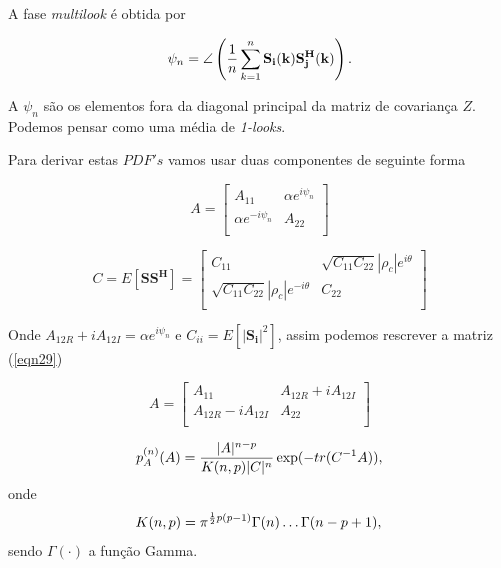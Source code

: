 \documentclass[12pt,a4paper]{article}
\begin{document}
A fase {\it multilook} é obtida por 

\begin{equation}\label{eqn28}
	\psi_n=\angle\left(\frac{1}{n}\sum_{k=1}^{n}\mathbf{S_i(k)S_j^{H}(k)}\right). \\
\end{equation}

A $\psi_n$ são os elementos fora da diagonal principal da matriz de covariança $Z$. Podemos pensar como uma média de {\it 1-looks}.

Para derivar estas $PDF's$ vamos usar duas componentes de seguinte forma

\begin{equation}\label{eqn29}
	A=\left[
\begin{array}{cc}
	A_{11}              & \alpha e^{i\psi_n} \\
	\alpha e^{-i\psi_n} & A_{22} \\
\end{array}\right]
\end{equation}


\begin{equation}\label{eqn30}
	C=E[\mathbf{SS^{H}}]=\left[
\begin{array}{cc}
	C_{11}              & \sqrt{C_{11}C_{22}}|\rho_c|e^{i\theta} \\
 \sqrt{C_{11}C_{22}}|\rho_c |e^{-i\theta} & C_{22}\\
\end{array}\right]
\end{equation}

Onde $A_{12R}+iA_{12I}=\alpha e^{i\psi_n}$ e $C_{ii}=E[|\mathbf{S_i}|^2]$, assim podemos rescrever a matriz (\ref{eqn29})

\begin{equation}\label{eqn31}
	A=\left[
\begin{array}{cc}
	A_{11}              & A_{12R}+iA_{12I} \\
	A_{12R}-iA_{12I}    & A_{22} \\
\end{array}\right]
\end{equation}


\begin{equation}\label{eqn32}
	p_A^{(n)}(A)=\frac{|A|^{n-p}}{K(n,p)|C|^n} \exp(-tr(C^{-1}A)), \\
\end{equation}
onde
\begin{equation}\label{eqn33}
	K(n,p)=\pi^{\frac{1}{2}p(p-1)}\Gamma(n)\dots\Gamma(n-p+1), \\
\end{equation}
sendo $\Gamma(\cdot)$ a função Gamma.
\end{document}
